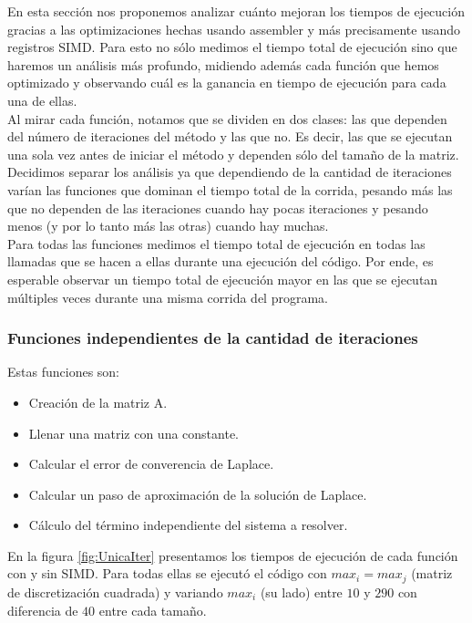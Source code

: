 \documentclass[a4paper]{article}
\begin{document}
En esta sección nos proponemos analizar cuánto mejoran los tiempos de 
ejecución gracias a las optimizaciones hechas usando assembler y más 
precisamente usando registros SIMD. Para esto no sólo medimos el 
tiempo total de ejecución sino que haremos 
un análisis más profundo, midiendo además cada función que hemos 
optimizado y observando cuál es la ganancia en tiempo de ejecución
para cada una de ellas.\\

Al mirar cada función, notamos que se dividen en dos clases: las que 
dependen del número de iteraciones del método y las que no. Es decir, 
las que se ejecutan una sola vez antes de iniciar el método y 
dependen sólo del tamaño de la matriz.\\

Decidimos separar los análisis ya que dependiendo de la cantidad de 
iteraciones varían las funciones que dominan el tiempo total de la 
corrida, pesando más las que no dependen de las iteraciones 
cuando hay pocas iteraciones y pesando menos (y por lo tanto más las otras) 
cuando hay muchas.\\

Para todas las funciones medimos el tiempo total de ejecución en 
todas las llamadas que se hacen a ellas durante una ejecución del 
código. Por ende, es esperable observar un tiempo total de ejecución mayor en las 
que se ejecutan múltiples veces durante una misma corrida del programa.

\subsubsection{Funciones independientes de la cantidad de iteraciones}

Estas funciones son:
\begin{itemize}
\item Creación de la matriz A.
\item Llenar una matriz con una constante.
\item Calcular el error de converencia de Laplace.
\item Calcular un paso de aproximación de la solución de Laplace.
\item Cálculo del término independiente del sistema a resolver.
\end{itemize}

En la figura \ref{fig:UnicaIter} presentamos los tiempos de ejecución 
de cada función con y sin SIMD. Para todas ellas se ejecutó el código 
con $max_i = max_j$ (matriz de discretización cuadrada) y variando 
$max_i$ (su lado) entre $10$ y $290$ con diferencia de $40$ entre cada tamaño.\\
\end{document}
